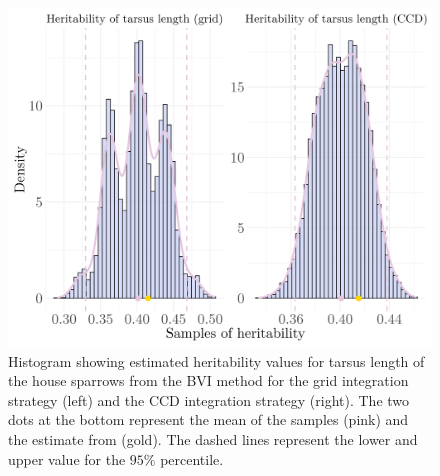 \begin{figure}[H]
  \centering
  \includegraphics[width=0.7\linewidth]{Figures/House sparrow study/Heritability_tarsus_combined.png}
  \caption[Estimated heritability of tarsus length]{Histogram showing estimated heritability values for tarsus length of the house sparrows from the BVI method for the grid integration strategy (left) and the CCD integration strategy (right). The two dots at the bottom represent the mean of the samples (pink) and the estimate from \citep{Silva2017} (gold). The dashed lines represent the lower and upper value for the $95\%$ percentile.}
  \label{fig:heritability_tarsus_combined_grid_ccd}
\end{figure}

